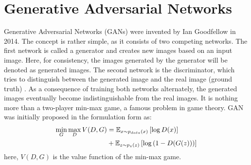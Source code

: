 \section{Generative Adversarial Networks}
Generative Adversarial Networks (GANs) were invented by Ian Goodfellow in 2014. The concept is rather simple, as it consists of two competing networks. The first network is called a generator and creates new images based on an input image. Here, for consistency, the images generated by the generator will be denoted as generated images. The second network is the discriminator, which tries to distinguish between the generated image and the real image (ground truth) \citep{goodfellow2014generative}.
As a consequence of training both networks alternately, the generated images eventually become indistinguishable from the real images. It is nothing more than a two-player min-max game, a famous problem in game theory. GAN was initially proposed in the formulation form as:
\begin{equation}
	\centering
	\begin{aligned}
		\min_{G} \max_{D} V(D, G) &= \mathbb{E}_{x \sim p_{data}(x)} \left[ \log D(x) \right] \\
		&+ \mathbb{E}_{z \sim p_{z}(z)} \left[ \log \left( 1-D(G(z)) \right) \right]
	\end{aligned}
	\label{eq:Basic_GAN}
\end{equation}
here, $V(D, G)$ is the value function of the min-max game. 

